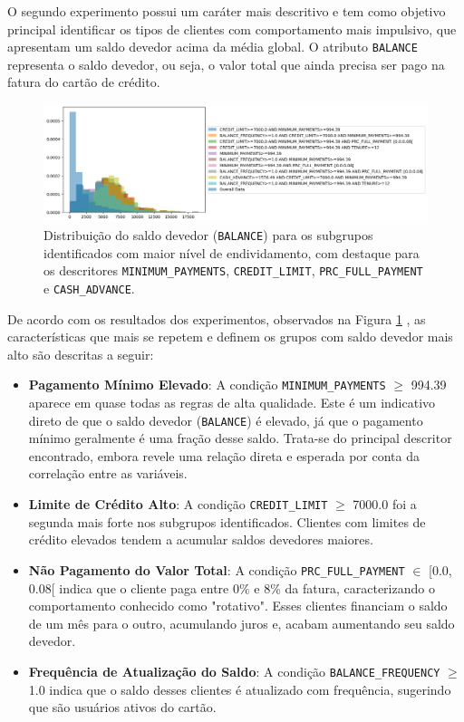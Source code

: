 \documentclass[12pt]{article}
\begin{document}
\hspace{1.2cm}O segundo experimento possui um caráter mais descritivo e tem como objetivo principal identificar os tipos de clientes com comportamento mais impulsivo, que apresentam um saldo devedor acima da média global. O atributo \texttt{BALANCE} representa o saldo devedor, ou seja, o valor total que ainda precisa ser pago na fatura do cartão de crédito.

\begin{figure}[h]
    \centering
    \includegraphics[width=1\textwidth]{imagens/experimento3.png}
    \caption{Distribuição do saldo devedor (\texttt{BALANCE}) para os subgrupos identificados com maior nível de endividamento, com destaque para os descritores \texttt{MINIMUM\_PAYMENTS}, \texttt{CREDIT\_LIMIT},
        \label{fig:experimento4}\texttt{PRC\_FULL\_PAYMENT} e \texttt{CASH\_ADVANCE}.}
\end{figure}

De acordo com os resultados dos experimentos, observados na Figura \ref{fig:experimento4} , as características que mais se repetem e definem os grupos com saldo devedor mais alto são descritas a seguir:

\begin{itemize}
    \item \textbf{Pagamento Mínimo Elevado}: A condição \texttt{MINIMUM\_PAYMENTS} $\geq$ 994.39 aparece em quase todas as regras de alta qualidade. Este é um indicativo direto de que o saldo devedor (\texttt{BALANCE}) é elevado, já que o pagamento mínimo geralmente é uma fração desse saldo. Trata-se do principal descritor encontrado, embora revele uma relação direta e esperada por conta da correlação entre as variáveis.

    \item \textbf{Limite de Crédito Alto}: A condição \texttt{CREDIT\_LIMIT} $\geq$ 7000.0 foi a segunda mais forte nos subgrupos identificados. Clientes com limites de crédito elevados tendem a acumular saldos devedores maiores.

    \item \textbf{Não Pagamento do Valor Total}: A condição \texttt{PRC\_FULL\_PAYMENT} $\in$ [0.0, 0.08[ indica que o cliente paga entre 0\% e 8\% da fatura, caracterizando o comportamento conhecido como "rotativo". Esses clientes financiam o saldo de um mês para o outro, acumulando juros e, acabam aumentando seu saldo devedor.

    \item \textbf{Frequência de Atualização do Saldo}: A condição \texttt{BALANCE\_FREQUENCY} $\geq$ 1.0 indica que o saldo desses clientes é atualizado com frequência, sugerindo que são usuários ativos do cartão.
\end{itemize}
\end{document}
